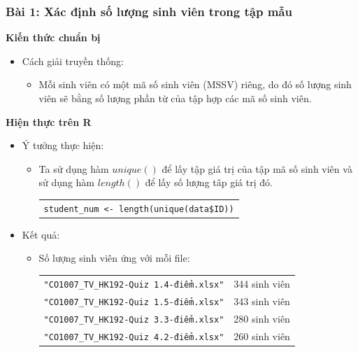 \documentclass[a4paper]{article}
\theoremstyle{definition}
\begin{document}
\subsubsection*{Bài 1: Xác định số lượng sinh viên trong tập mẫu}
\bf Kiến thức chuẩn bị\normalfont
\begin{itemize}
    \item Cách giải truyền thống:
    \begin{itemize}
        \item Mỗi sinh viên có một mã số sinh viên (MSSV) riêng, do đó số lượng sinh viên sẽ bằng số lượng phần từ của tập hợp các mã số sinh viên.
    \end{itemize}
\end{itemize}
\bf Hiện thực trên R\normalfont
\begin{itemize}
    \item Ý tưởng thực hiện:
    \begin{itemize}
        \item Ta sử dụng hàm $unique()$ để lấy tập giá trị của tập mã số sinh viên và sử dụng hàm $length()$ để lấy số lượng tâp giá trị đó.
        \begin{center}
            \begin{tabular}{p{13cm}}
                \texttt{student\_num <- length(unique(data\$ID))}\\
            \end{tabular}
        \end{center}
    \end{itemize}
    \item Kết quả: 
    \begin{itemize}
        \item Số lượng sinh viên ứng với mỗi file:
        \begin{center}
            \begin{tabular}{l l}
                 \texttt{"CO1007\_TV\_HK192-Quiz 1.4-điểm.xlsx"} & 344 sinh viên\\ 
                 \texttt{"CO1007\_TV\_HK192-Quiz 1.5-điểm.xlsx"} & 343 sinh viên\\ 
                 \texttt{"CO1007\_TV\_HK192-Quiz 3.3-điểm.xlsx"} & 280 sinh viên\\ 
                 \texttt{"CO1007\_TV\_HK192-Quiz 4.2-điểm.xlsx"} & 260 sinh viên\\ 
            \end{tabular}
        \end{center}
    \end{itemize}
\end{itemize}
\end{document}
